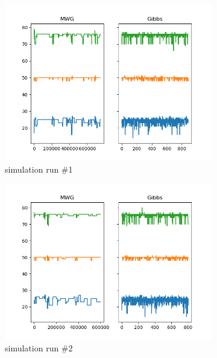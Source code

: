 \begin{figure}[H]
    \centering
    \begin{subfigure}{.3\textwidth}
    	\centering
        \includegraphics[width=\linewidth]{../../plots/Trace_post_burnin_M4_N100_NMCMC3_seed0_diffind2.png}
        \caption{simulation run \#1}
    \end{subfigure}
    \begin{subfigure}{.3\textwidth}
        \centering
    	\includegraphics[width=\linewidth]{../../plots/Trace_post_burnin_M4_N100_NMCMC3_seed1_diffind2.png}
    	\caption{simulation run \#2}
	\end{subfigure}
	\begin{subfigure}{.3\textwidth}
	    \centering

\end{subfigure}
\end{figure}
